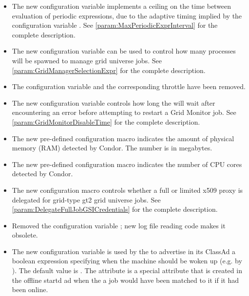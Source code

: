 \begin{itemize}
\item The new configuration variable 
  implements a ceiling on the time between evaluation of periodic expressions,
  due to the adaptive timing implied by the configuration variable
  .
  See \ref{param:MaxPeriodicExprInterval} for the complete description.

\item The new configuration variable 
can be used to control how many  processes will be
spawned to manage grid universe jobs. 
See \ref{param:GridManagerSelectionExpr} for the complete description.

\item The configuration variable
 and the
corresponding throttle 
have been removed.

\item The new configuration variable 
controls how long the  will wait after encountering
an error before attempting to restart a Grid Monitor job.
See \ref{param:GridMonitorDisableTime} for the complete description.

\item The new pre-defined configuration macro 
indicates the amount of physical memory (RAM) detected by Condor.
The number is in megabytes.

\item The new pre-defined configuration macro 
indicates the number of CPU cores detected by Condor.

\item The new configuration macro 
controls whether a full or limited x509 proxy is delegated for grid-type
gt2 grid universe jobs. See \ref{param:DelegateFullJobGSICredentials}
for the complete description.

\item Removed the configuration variable
; new log file reading code makes it
obsolete.

\item The new configuration variable  is used by
the  to advertise in its ClassAd a boolean expression
specifying when the machine should be woken up (e.g. by
).  The default value is .
The  attribute is a special attribute that is created
in the offline startd ad when the a job would have been matched to it
if it had been online.


\end{itemize}

